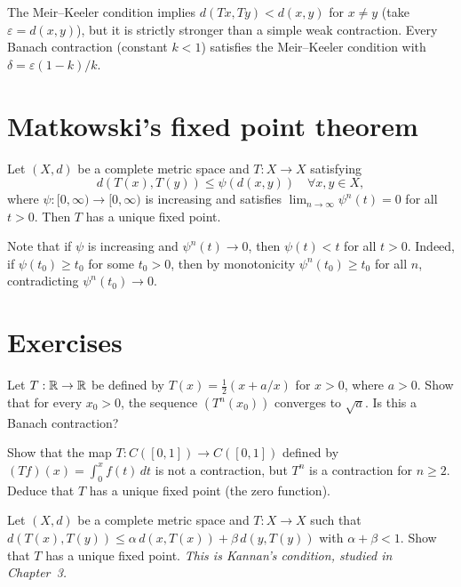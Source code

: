 \begin{remark}
The Meir--Keeler condition implies $d(Tx, Ty) < d(x,y)$ for $x \neq y$ (take
$\varepsilon = d(x,y)$), but it is strictly stronger than a simple weak
contraction. Every Banach contraction (constant $k < 1$) satisfies the
Meir--Keeler condition with $\delta = \varepsilon(1-k)/k$.
\end{remark}

\section{Matkowski's fixed point theorem}

\begin{theorem}[Matkowski, 1975]
Let $(X, d)$ be a complete metric space and $T : X \to X$ satisfying
\[
    d(T(x), T(y)) \leq \psi(d(x, y)) \quad \forall x, y \in X,
\]
where $\psi : [0, \infty) \to [0, \infty)$ is increasing and satisfies
$\lim_{n \to \infty} \psi^n(t) = 0$ for all $t > 0$. Then $T$ has a unique
fixed point.
\end{theorem}

\begin{remark}
Note that if $\psi$ is increasing and $\psi^n(t) \to 0$, then $\psi(t) < t$
for all $t > 0$. Indeed, if $\psi(t_0) \geq t_0$ for some $t_0 > 0$, then by
monotonicity $\psi^n(t_0) \geq t_0$ for all $n$, contradicting $\psi^n(t_0) \to 0$.
\end{remark}

\section{Exercises}

\begin{exercise}
Let $T : \mathbb{R} \to \mathbb{R}$ be defined by $T(x) = \frac{1}{2}(x + a/x)$ for $x > 0$,
where $a > 0$. Show that for every $x_0 > 0$, the sequence $(T^n(x_0))$
converges to $\sqrt{a}$. Is this a Banach contraction?
\end{exercise}

\begin{exercise}
Show that the map $T : C([0,1]) \to C([0,1])$ defined by
$(Tf)(x) = \int_0^x f(t) \, dt$ is not a contraction, but $T^n$ is a
contraction for $n \geq 2$. Deduce that $T$ has a unique fixed point (the zero
function).
\end{exercise}

\begin{exercise}
Let $(X, d)$ be a complete metric space and $T : X \to X$ such that
$d(T(x), T(y)) \leq \alpha \, d(x, T(x)) + \beta \, d(y, T(y))$ with
$\alpha + \beta < 1$. Show that $T$ has a unique fixed point.
\textit{This is Kannan's condition, studied in Chapter~3.}
\end{exercise}

